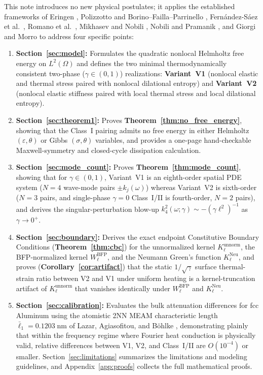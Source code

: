 This note introduces no new physical postulates; it applies the established frameworks of Eringen \cite{Eringen1974}, Polizzotto and Borino--Failla--Parrinello \cite{DiLuzio2005,MarottiDeSciarra2009}, Fern{\'a}ndez-S{\'a}ez et al.\ \cite{FernandezSaez2016}, Romano et al.\ \cite{Romano2017}, Mikhasev and Nobili \cite{MikhasevNobili2020}, Nobili and Pramanik \cite{NobiliPramanik2025b}, and Giorgi and Morro \cite{GiorgiMorro2025} to address four specific points:
\begin{enumerate}[leftmargin=*]
  \item \textbf{Section~\ref{sec:model}:} Formulates the quadratic nonlocal Helmholtz free energy on $L^2(\Omega)$ and defines the two minimal thermodynamically consistent two-phase ($\gamma \in (0,1)$) realizations: \textbf{Variant~V1} (nonlocal elastic and thermal stress paired with nonlocal dilational entropy) and \textbf{Variant~V2} (nonlocal elastic stiffness paired with local thermal stress and local dilational entropy).
  \item \textbf{Section~\ref{sec:theorem1}:} Proves \textbf{Theorem~\ref{thm:no_free_energy}}, showing that the Class~I pairing admits no free energy in either Helmholtz $(\varepsilon,\theta)$ or Gibbs $(\sigma,\theta)$ variables, and provides a one-page hand-checkable Maxwell-symmetry and closed-cycle dissipation calculation.
  \item \textbf{Section~\ref{sec:mode_count}:} Proves \textbf{Theorem~\ref{thm:mode_count}}, showing that for $\gamma \in (0,1)$, Variant~V1 is an eighth-order spatial PDE system ($N=4$ wave-mode pairs $\pm k_j(\omega)$) whereas Variant~V2 is sixth-order ($N=3$ pairs, and single-phase $\gamma=0$ Class~I/II is fourth-order, $N=2$ pairs), and derives the singular-perturbation blow-up $k_4^2(\omega;\gamma) \sim -(\gamma\ell^2)^{-1}$ as $\gamma \to 0^+$.
  \item \textbf{Section~\ref{sec:boundary}:} Derives the exact endpoint Constitutive Boundary Conditions (\textbf{Theorem~\ref{thm:cbc}}) for the unnormalized kernel $K_\ell^{\mathrm{unnorm}}$, the BFP-normalized kernel $W_\ell^{\mathrm{BFP}}$, and the Neumann Green's function $K_\ell^{\mathrm{Neu}}$, and proves (\textbf{Corollary~\ref{cor:artifact}}) that the static $1/\sqrt{\gamma}$ surface thermal-strain ratio between V2 and V1 under uniform heating is a kernel-truncation artifact of $K_\ell^{\mathrm{unnorm}}$ that vanishes identically under $W_\ell^{\mathrm{BFP}}$ and $K_\ell^{\mathrm{Neu}}$.
  \item \textbf{Section~\ref{sec:calibration}:} Evaluates the bulk attenuation differences for fcc Aluminum using the atomistic 2NN MEAM characteristic length $\bar{\ell}_1 = 0.1203\;\mathrm{nm}$ of Lazar, Agiasofitou, and B{\"o}hlke \cite{Lazar2022}, demonstrating plainly that within the frequency regime where Fourier heat conduction is physically valid, relative differences between V1, V2, and Class~I/II are $O(10^{-4})$ or smaller. Section~\ref{sec:limitations} summarizes the limitations and modeling guidelines, and Appendix~\ref{app:proofs} collects the full mathematical proofs.
\end{enumerate}
